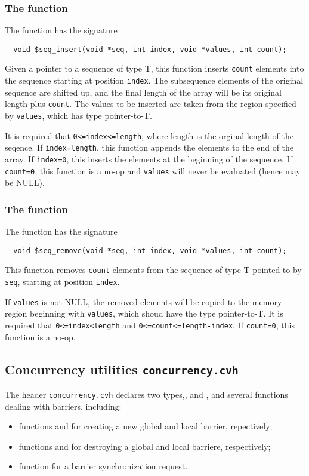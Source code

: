 \subsubsection{The \cseqinsert{} function}
The \cseqinsert{} function has the signature
\begin{verbatim}
  void $seq_insert(void *seq, int index, void *values, int count);
\end{verbatim}

Given a pointer to a sequence of type T, this function inserts \texttt{count} elements into the sequence starting at position
 \texttt{index}. The subsequence elements of the original sequence are shifted up, and the final length of the array will be its original length
plus \texttt{count}. The values to be inserted are taken from the region specified by \texttt{values}, which has type pointer-to-T.  

It is required that \texttt{0<=index<=length}, where length is the orginal length of the seqence. If \texttt{index=length}, this function appends the elements to the end of the array. If \texttt{index=0}, this inserts the elements at the beginning of the sequence.  If \texttt{count=0}, this function is a no-op and \texttt{values} will never be evaluated (hence may be NULL).

\subsubsection{The \cseqrm{} function}
The \cseqrm{} function has the signature
\begin{verbatim}
  void $seq_remove(void *seq, int index, void *values, int count);
\end{verbatim}

This function removes \texttt{count} elements from the sequence of type T pointed to by \texttt{seq}, starting at position
\texttt{index}. 

If \texttt{values} is not NULL, the removed elements will be copied to the memory region beginning with \texttt{values}, which shoud have the type pointer-to-T. It is required that \texttt{0<=index<length} and \texttt{0<=count<=length-index}. If \texttt{count=0}, this function is a no-op.

\subsection{Concurrency utilities \texttt{concurrency.cvh}}
\label{subsec:concurrencyLibrary}

The header \texttt{concurrency.cvh} declares two types,, \cgbarrier{} and \cbarrier{}, and several functions dealing with barriers, including:
\begin{itemize}
\item functions \cgbarriercreate{} and \cbarriercreate{} for creating a new global and local barrier, repectively;
\item functions \cgbarrierdestroy{} and \cbarrierdestroy{} for destroying a global and local barriere, respectively;
\item function \cbarriercall{} for a barrier synchronization request.
\end{itemize}


